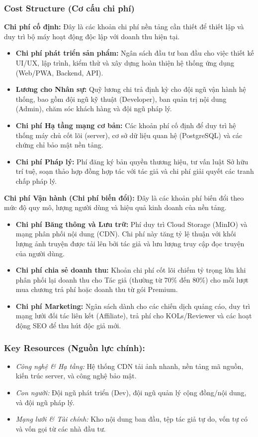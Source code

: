 \subsubsection{Cost Structure (Cơ cấu chi phí)}
\textbf{Chi phí cố định:}
Đây là các khoản chi phí nền tảng cần thiết để thiết lập và duy trì bộ máy hoạt động độc lập với doanh thu hiện tại.
\begin{itemize}
    \item \textbf{Chi phí phát triển sản phẩm:} Ngân sách đầu tư ban đầu cho việc thiết kế UI/UX, lập trình, kiểm thử và xây dựng hoàn thiện hệ thống ứng dụng (Web/PWA, Backend, API).
    \item \textbf{Lương cho Nhân sự:} Quỹ lương chi trả định kỳ cho đội ngũ vận hành hệ thống, bao gồm đội ngũ kỹ thuật (Developer), ban quản trị nội dung (Admin), chăm sóc khách hàng và đội ngũ pháp lý.
    \item \textbf{Chi phí Hạ tầng mạng cơ bản:} Các khoản phí cố định để duy trì hệ thống máy chủ cốt lõi (server), cơ sở dữ liệu quan hệ (PostgreSQL) và các chứng chỉ bảo mật nền tảng.
    \item \textbf{Chi phí Pháp lý:} Phí đăng ký bản quyền thương hiệu, tư vấn luật Sở hữu trí tuệ, soạn thảo hợp đồng hợp tác với tác giả và chi phí giải quyết các tranh chấp pháp lý.
\end{itemize}

\textbf{Chi phí Vận hành (Chi phí biến đổi):}
Đây là các khoản phí biến đổi theo mức độ quy mô, lượng người dùng và hiệu quả kinh doanh của nền tảng.
\begin{itemize}
    \item \textbf{Chi phí Băng thông và Lưu trữ:} Phí duy trì Cloud Storage (MinIO) và mạng phân phối nội dung (CDN). Chi phí này tăng tỷ lệ thuận với khối lượng ảnh truyện được tải lên bởi tác giả và lưu lượng truy cập đọc truyện của người dùng.
    \item \textbf{Chi phí chia sẻ doanh thu:} Khoản chi phí cốt lõi chiếm tỷ trọng lớn khi phân phối lại doanh thu cho Tác giả (thường từ 70\% đến 80\%) cho mỗi lượt mua chương trả phí hoặc doanh thu từ gói Premium.
    \item \textbf{Chi phí Marketing:} Ngân sách dành cho các chiến dịch quảng cáo, duy trì mạng lưới đối tác liên kết (Affiliate), trả phí cho KOLs/Reviewer và các hoạt động SEO để thu hút độc giả mới.
\end{itemize}

\subsubsection{Key Resources (Nguồn lực chính):}
\begin{itemize}
    \item \textit{Công nghệ \& Hạ tầng:} Hệ thống CDN tải ảnh nhanh, nền tảng mã nguồn, kiến trúc server, và công nghệ bảo mật.
    \item \textit{Con người:} Đội ngũ phát triển (Dev), đội ngũ quản lý cộng đồng/nội dung, và đội ngũ pháp lý.
    \item \textit{Mạng lưới \& Tài chính:} Kho nội dung ban đầu, tệp tác giả tự do, vốn tự có và vốn gọi từ các nhà đầu tư.
\end{itemize}

